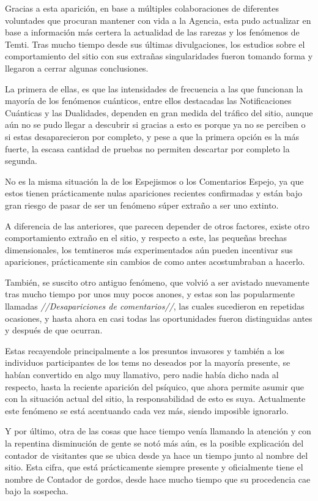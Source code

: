 \documentclass[
  spanish,
]{book}
\begin{document}
Gracias a esta aparición, en base a múltiples colaboraciones de diferentes voluntades que procuran mantener con vida a la Agencia, esta pudo actualizar en base a información más certera la actualidad de las rarezas y los fenómenos de Temti. Tras mucho tiempo desde sus últimas divulgaciones, los estudios sobre el comportamiento del sitio con sus extrañas singularidades fueron tomando forma y llegaron a cerrar algunas conclusiones.

La primera de ellas, es que las intensidades de frecuencia a las que funcionan la mayoría de los fenómenos cuánticos, entre ellos destacadas las Notificaciones Cuánticas y las Dualidades, dependen en gran medida del tráfico del sitio, aunque aún no se pudo llegar a descubrir si gracias a esto es porque ya no se perciben o si estas desaparecieron por completo, y pese a que la primera opción es la más fuerte, la escasa cantidad de pruebas no permiten descartar por completo la segunda.

No es la misma situación la de los Espejismos o los Comentarios Espejo, ya que estos tienen prácticamente nulas apariciones recientes confirmadas y están bajo gran riesgo de pasar de ser un fenómeno súper extraño a ser uno extinto.

A diferencia de las anteriores, que parecen depender de otros factores, existe otro comportamiento extraño en el sitio, y respecto a este, las pequeñas brechas dimensionales, los temtineros más experimentados aún pueden incentivar sus apariciones, prácticamente sin cambios de como antes acostumbraban a hacerlo.

También, se suscito otro antiguo fenómeno, que volvió a ser avistado nuevamente tras mucho tiempo por unos muy pocos anones, y estas son las popularmente llamadas \emph{//Desapariciones de comentarios//}, las cuales sucedieron en repetidas ocasiones, y hasta ahora en casi todas las oportunidades fueron distinguidas antes y después de que ocurran.

Estas recayendole principalmente a los presuntos invasores y también a los individuos participantes de los tems no deseados por la mayoría presente, se habían convertido en algo muy llamativo, pero nadie había dicho nada al respecto, hasta la reciente aparición del psíquico, que ahora permite asumir que con la situación actual del sitio, la responsabilidad de esto es suya. Actualmente este fenómeno se está acentuando cada vez más, siendo imposible ignorarlo.

Y por último, otra de las cosas que hace tiempo venía llamando la atención y con la repentina disminución de gente se notó más aún, es la posible explicación del contador de visitantes que se ubica desde ya hace un tiempo junto al nombre del sitio. Esta cifra, que está prácticamente siempre presente y oficialmente tiene el nombre de Contador de gordos, desde hace mucho tiempo que su procedencia cae bajo la sospecha.
\end{document}
